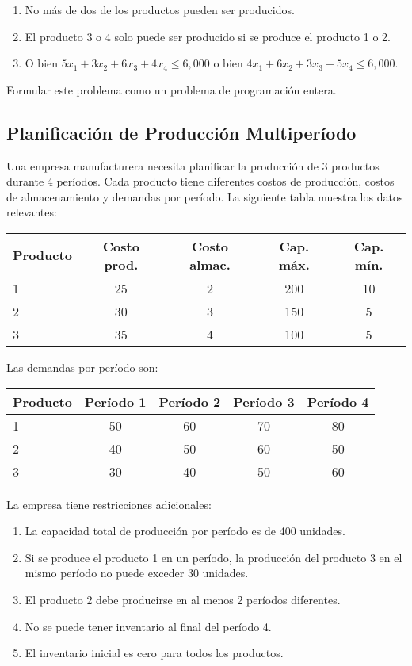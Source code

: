 \documentclass[12pt]{article}
\begin{document}
\begin{enumerate}[label=\arabic*.]
    \item No más de dos de los productos pueden ser producidos.
    \item El producto 3 o 4 solo puede ser producido si se produce el producto 1 o 2.
    \item O bien $5x_1 + 3x_2 + 6x_3 + 4x_4 \leq 6,000$ o bien $4x_1 + 6x_2 + 3x_3 + 5x_4 \leq 6,000$.
\end{enumerate}

Formular este problema como un problema de programación entera.

\subsection{Planificación de Producción Multiperíodo}
Una empresa manufacturera necesita planificar la producción de 3 productos durante 4 períodos. Cada producto tiene diferentes costos de producción, costos de almacenamiento y demandas por período. La siguiente tabla muestra los datos relevantes:

\begin{table}[h]
\centering
\begin{tabular}{lcccc}
\toprule
\textbf{Producto} & \textbf{Costo prod.} & \textbf{Costo almac.} & \textbf{Cap. máx.} & \textbf{Cap. mín.} \\
\midrule
1 & 25 & 2 & 200 & 10 \\
2 & 30 & 3 & 150 & 5 \\
3 & 35 & 4 & 100 & 5 \\
\bottomrule
\end{tabular}
\end{table}

Las demandas por período son:
\begin{table}[h]
\centering
\begin{tabular}{lcccc}
\toprule
\textbf{Producto} & \textbf{Período 1} & \textbf{Período 2} & \textbf{Período 3} & \textbf{Período 4} \\
\midrule
1 & 50 & 60 & 70 & 80 \\
2 & 40 & 50 & 60 & 50 \\
3 & 30 & 40 & 50 & 60 \\
\bottomrule
\end{tabular}
\end{table}

La empresa tiene restricciones adicionales:
\begin{enumerate}[label=\arabic*.]
    \item La capacidad total de producción por período es de 400 unidades.
    \item Si se produce el producto 1 en un período, la producción del producto 3 en el mismo período no puede exceder 30 unidades.
    \item El producto 2 debe producirse en al menos 2 períodos diferentes.
    \item No se puede tener inventario al final del período 4.
    \item El inventario inicial es cero para todos los productos.
\end{enumerate}
\end{document}
